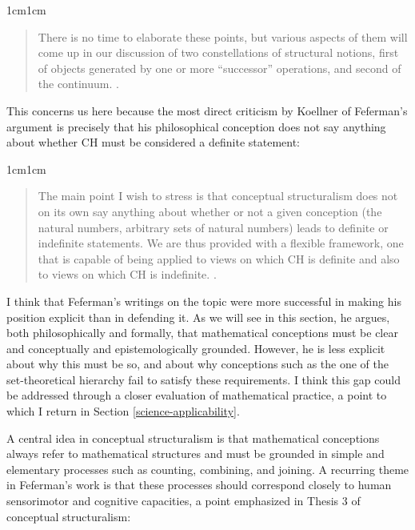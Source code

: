 \documentclass[11pt,a4paper]{book}
\theoremstyle{plain}
\begin{document}
\begin{adjustwidth}{1cm}{1cm}
\begin{quote}
\small
There is no time to elaborate these points, but various aspects of them will come up in our discussion of two constellations of structural notions, first of objects generated by one or more “successor” operations, and second of the continuum. \textcite[p. 12]{Feferman2011a}.
\end{quote}
\end{adjustwidth}

This concerns us here because the most direct criticism by Koellner of Feferman's argument is precisely that his philosophical conception does not say anything about whether CH must be considered a definite statement:

\begin{adjustwidth}{1cm}{1cm}
\begin{quote}
\small
The main point I wish to stress is that conceptual structuralism does not on its own say anything about whether or not a given conception (the natural numbers, arbitrary sets of natural numbers) leads to definite or indefinite statements. We are thus provided with a flexible framework, one that is capable of being applied to views on which CH is definite and also to views on which CH is indefinite. \textcite[p. 10]{Koellner2022}.
\end{quote}
\end{adjustwidth}

I think that Feferman's writings on the topic were more successful in making his position explicit than in defending it. As we will see in this section, he argues, both philosophically and formally, that mathematical conceptions must be clear and conceptually and epistemologically grounded. However, he is less explicit about why this must be so, and about why conceptions such as the one of the set-theoretical hierarchy fail to satisfy these requirements. I think this gap could be addressed through a closer evaluation of mathematical practice, a point to which I return in Section \ref{science-applicability}.

A central idea in conceptual structuralism is that mathematical conceptions always refer to mathematical structures and must be grounded in simple and elementary processes such as counting, combining, and joining. A recurring theme in Feferman's work is that these processes should correspond closely to human sensorimotor and cognitive capacities, a point emphasized in Thesis 3 of conceptual structuralism:
\end{document}
